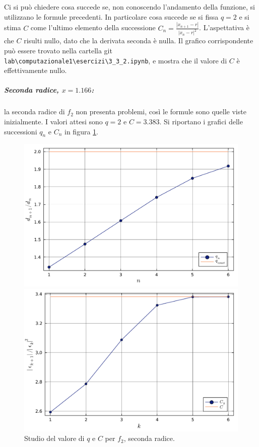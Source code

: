 \documentclass[letterpaper, 12pt]{article}
\begin{document}
Ci si può chiedere cosa succede se, non conoscendo l'andamento della funzione, si utilizzano le formule
precedenti. In particolare cosa succede se si fissa $q = 2$ e si stima $C$ come l'ultimo elemento della successione
$C_n = \frac{|x_{n+1}-r|}{|x_n-r|^2}$. L'aspettativa è che $C$ risulti nullo, dato che la derivata seconda
è nulla. Il grafico corrispondente può essere trovato nella cartella git
\verb|lab\computazionale1\esercizi\3_3_2.ipynb|, e mostra che il valore di $C$ è effettivamente nullo. \\ 

\subparagraph{Seconda radice, $x = 1.166$: } la seconda radice di $f_2$ non presenta problemi, così le formule
sono quelle viste inizialmente. I valori attesi sono $q = 2$ e $C = 3.383$. 
Si riportano i grafici delle successioni $q_n$ e $C_n$ in figura \ref{fig:es3_3_2_4}.
\begin{figure}[!ht]
    \centering
    \begin{minipage}[b]{0.47\textwidth}
        \includegraphics[width=\textwidth]{3322_q2.pdf}
    \end{minipage}
    \hspace{0.5cm}
    \begin{minipage}[b]{0.47\textwidth}
        \includegraphics[width=\textwidth]{3322_C2.pdf}
    \end{minipage}
    \caption{Studio del valore di $q$ e $C$ per $f_2$, seconda radice.}
    \label{fig:es3_3_2_4}
\end{figure}
\end{document}
